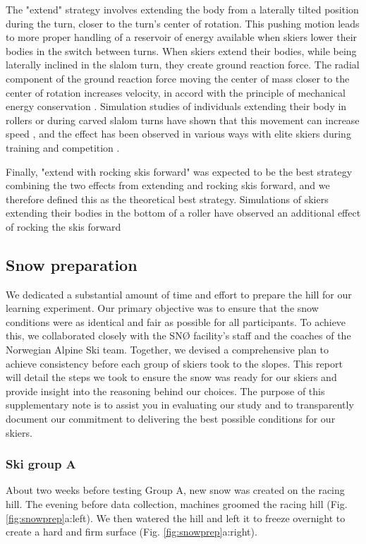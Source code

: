 \documentclass{article}
\begin{document}
The "extend" strategy involves extending the body from a laterally tilted position during the turn, closer to the turn's center of rotation. This pushing motion leads to more proper handling of a reservoir of energy available when skiers lower their bodies in the switch between turns. When skiers extend their bodies, while being laterally inclined in the slalom turn, they create ground reaction force. The radial component of the ground reaction force moving the center of mass closer to the center of rotation increases velocity, in accord with the principle of mechanical energy conservation \cite{lind_physics_2013}. Simulation studies of individuals extending their body in rollers or during carved slalom turns have shown that this movement can increase speed \cite{mote_accelerations_1983,luginbuhl_identification_2023}, and the effect has been observed in various ways with elite skiers during training and competition \cite{reid_kinematic_2010, magelssen_is_2022, supej_differential_2008}. 

Finally, "extend with rocking skis forward" was expected to be the best strategy combining the two effects from extending and rocking skis forward, and we therefore defined this as the theoretical best strategy. Simulations of skiers extending their bodies in the bottom of a roller have observed an additional effect of rocking the skis forward \cite{mote_accelerations_1983}



\subsection{Snow preparation}\label{sup_snowprep}
We dedicated a substantial amount of time and effort to prepare the hill for our learning experiment. Our primary objective was to ensure that the snow conditions were as identical and fair as possible for all participants. To achieve this, we collaborated closely with the SNØ facility’s staff and the coaches of the Norwegian Alpine Ski team. Together, we devised a comprehensive plan to achieve consistency before each group of skiers took to the slopes. This report will detail the steps we took to ensure the snow was ready for our skiers and provide insight into the reasoning behind our choices. The purpose of this supplementary note is to assist you in evaluating our study and to transparently document our commitment to delivering the best possible conditions for our skiers.

\subsubsection*{Ski group A}
About two weeks before testing Group A, new snow was created on the racing hill. The evening before data collection, machines groomed the racing hill (Fig. \ref{fig:snowprep}a:left). We then watered the hill and left it to freeze overnight to create a hard and firm surface (Fig. \ref{fig:snowprep}a:right). 
\end{document}
